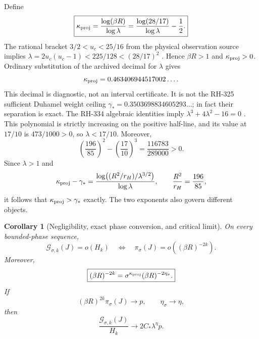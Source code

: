 \documentclass[11pt]{article}
\newtheorem{corollary}[theorem]{Corollary}
\theoremstyle{remark}
\newcommand{\cG}{\mathcal G}
\begin{document}
Define
\begin{equation}\label{eq:kappa}
 \boxed{
 \kappa_{\rm proj}
 =\frac{\log(\beta R)}{\log\lambda}
 =\frac{\log(28/17)}{\log\lambda}-\frac12.}
\end{equation}
The rational bracket $3/2<u_c<25/16$ from the physical observation source
implies
$\lambda=2u_c(u_c-1)<225/128<(28/17)^2$
\citep{WangObservation2026}.  Hence $\beta R>1$ and
$\kappa_{\rm proj}>0$.  Ordinary substitution of the archived decimal for
$\lambda$ gives
\begin{equation}\label{eq:kappa-decimal}
 \kappa_{\rm proj}=0.463406944517002\ldots .
\end{equation}
This decimal is diagnostic, not an interval certificate.  It is not the
RH-325 sufficient Duhamel weight ceiling
$\gamma_*=0.3503698834605293\ldots$; in fact their separation is exact.
The RH-334 algebraic identities imply
$\lambda^3+4\lambda^2-16=0$ \citep{WangObservation2026}.  This polynomial is
strictly increasing on the positive half-line, and its value at $17/10$ is
$473/1000>0$, so $\lambda<17/10$.  Moreover,
\[
 \left(\frac{196}{85}\right)^2-\left(\frac{17}{10}\right)^3
 =\frac{116783}{289000}>0.
\]
Since $\lambda>1$ and
\[
 \kappa_{\rm proj}-\gamma_*
 =\frac{\log\!\left((R^2/r_H)/\lambda^{3/2}\right)}{\log\lambda},
 \qquad \frac{R^2}{r_H}=\frac{196}{85},
\]
it follows that $\kappa_{\rm proj}>\gamma_*$ exactly.  The two exponents
also govern different objects.

\begin{corollary}[Negligibility, exact phase conversion, and critical limit]
\label{cor:threshold}
On every bounded-phase sequence,
\begin{equation}\label{eq:iff}
 \cG_{\sigma,k}(J)=o(H_k)
 \quad\Longleftrightarrow\quad
 \pi_\sigma(J)=o((\beta R)^{-2k}).
\end{equation}
Moreover,
\begin{equation}\label{eq:phase-conversion}
 \boxed{
 (\beta R)^{-2k}
 =\sigma^{\kappa_{\rm proj}}
  (\beta R)^{-2\eta_\sigma}.}
\end{equation}
If
\begin{equation}\label{eq:critical-assumption}
 (\beta R)^{2k}\pi_\sigma(J)\longrightarrow p,
 \qquad \eta_\sigma\longrightarrow\eta,
\end{equation}
then
\begin{equation}\label{eq:critical-limit}
 \frac{\cG_{\sigma,k}(J)}{H_k}
 \longrightarrow 2C_*\lambda^\eta p.
\end{equation}
\end{corollary}
\end{document}
